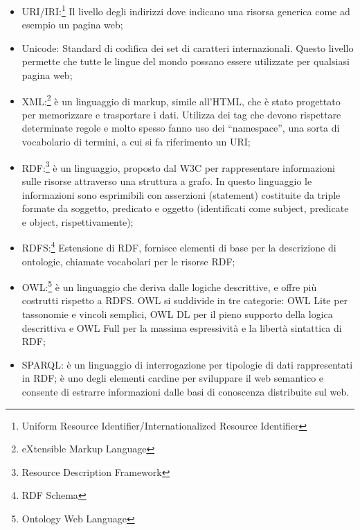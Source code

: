 \documentclass[a4paper,11pt]{article}
\begin{document}
\begin{itemize}	
	\item URI/IRI:\footnote{Uniform Resource Identifier/Internationalized Resource Identifier} Il livello degli indirizzi dove indicano una risorsa generica come ad esempio un pagina web;
	\item Unicode: Standard di codifica dei set di caratteri internazionali. Questo livello permette che tutte le lingue del mondo possano essere utilizzate per qualsiasi pagina web;
	\item XML:\footnote{eXtensible Markup Language} è un linguaggio di markup, simile all'HTML, che è stato progettato per memorizzare e trasportare i dati. Utilizza dei tag che devono rispettare determinate regole e molto spesso fanno uso dei “namespace”, una sorta di vocabolario di termini, a cui si fa riferimento un URI;				
	\item RDF:\footnote{Resource Description Framework} è un linguaggio, proposto dal W3C per rappresentare informazioni sulle risorse attraverso una struttura a grafo. In questo linguaggio le informazioni sono esprimibili con asserzioni (statement) costituite da triple formate da soggetto, predicato e oggetto (identificati come subject, predicate e object, rispettivamente);
	\item RDFS:\footnote{RDF Schema} Estensione di RDF, fornisce elementi di base per la descrizione di ontologie, chiamate vocabolari per le risorse RDF;
	\item OWL:\footnote{Ontology Web Language} è un linguaggio che deriva dalle logiche descrittive, e offre più costrutti rispetto a RDFS. OWL si suddivide in tre categorie: OWL Lite per tassonomie e vincoli semplici, OWL DL per il pieno supporto della logica descrittiva e OWL Full per la massima espressività e la libertà sintattica di RDF;
	\item SPARQL: è un linguaggio di interrogazione per tipologie di dati rappresentati in RDF; è uno degli elementi cardine per sviluppare il web semantico e consente di estrarre informazioni dalle basi di conoscenza distribuite sul web.
\end{itemize}
\end{document}
